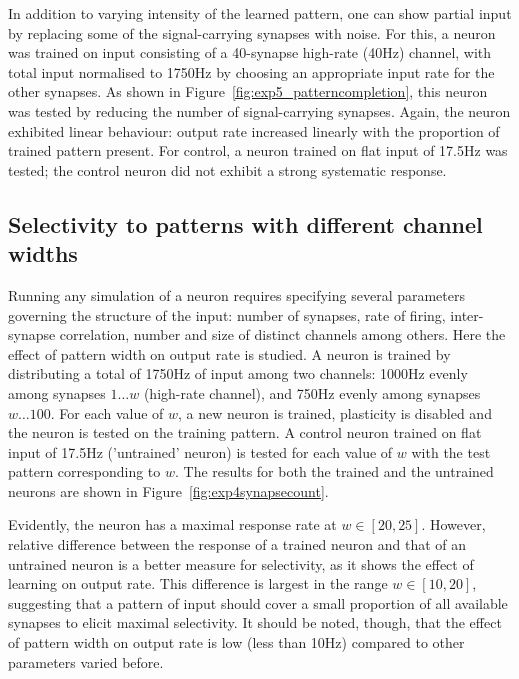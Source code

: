\documentclass[a4paper,12pt]{report}
\theoremstyle{definition}
\begin{document}
In addition to varying intensity of the learned pattern, one can show partial input by replacing some of the signal-carrying synapses with noise. For this, a neuron was trained on input consisting of a 40-synapse high-rate (40Hz) channel, with total input normalised to 1750Hz by choosing an appropriate input rate for the other synapses. As shown in Figure~\ref{fig:exp5_patterncompletion}, this neuron was tested by reducing the number of signal-carrying synapses. Again, the neuron exhibited linear behaviour: output rate increased linearly with the proportion of trained pattern present. For control, a neuron trained on flat input of 17.5Hz was tested; the control neuron did not exhibit a strong systematic response.







\subsection{Selectivity to patterns with different channel widths}
\label{subsec:patternwidths}


Running any simulation of a neuron requires specifying several parameters governing the structure of the input: number of synapses, rate of firing, inter-synapse correlation, number and size of distinct channels among others. Here the effect of pattern width on output rate is studied. A neuron is trained by distributing a total of 1750Hz of input among two channels: 1000Hz evenly among synapses $1 \ldots w$ (high-rate channel), and 750Hz evenly among synapses $w \ldots 100$. For each value of $w$, a new neuron is trained, plasticity is disabled and the neuron is tested on the training pattern. A control neuron trained on flat input of 17.5Hz ('untrained' neuron) is tested for each value of $w$ with the test pattern corresponding to $w$. The results for both the trained and the untrained neurons are shown in Figure~\ref{fig:exp4synapsecount}.

Evidently, the neuron has a maximal response rate at $w\in[20,25]$. However, relative difference between the response of a trained neuron and that of an untrained neuron is a better measure for selectivity, as it shows the effect of learning on output rate. This difference is largest in the range $w \in [10,20]$, suggesting that a pattern of input should cover a small proportion of all available synapses to elicit maximal selectivity. It should be noted, though, that the effect of pattern width on output rate is low (less than 10Hz) compared to other parameters varied before.
\end{document}
